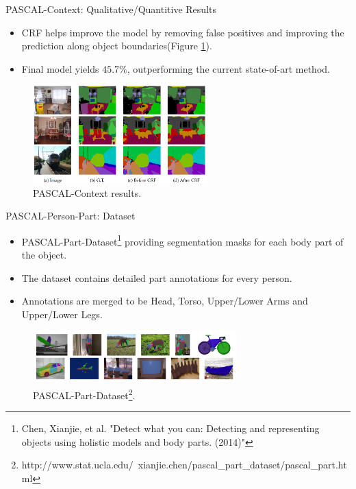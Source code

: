 \documentclass{beamer}
\begin{document}
\begin{frame}{PASCAL-Context: Qualitative/Quantitive Results}	
\begin{itemize}
	\item CRF helps improve the model by removing false positives and improving the prediction along object boundaries({\color{blue}Figure \ref{fig:M3}}).
	\item Final model yields {\color{blue}$45.7\%$}, outperforming the current state-of-art method.
\end{itemize}
\vspace{-0.4cm}
\begin{figure}
	\centering
	\includegraphics[width=0.60\textwidth]{figure/ss32.png}
	\captionsetup{justification=centering}
	\caption{PASCAL-Context results.}
	\label{fig:M3}
\end{figure}
\vspace{-0.4cm}
\end{frame}

\begin{frame}{PASCAL-Person-Part: Dataset}
\begin{itemize}
	\item {\color{blue}PASCAL-Part-Dataset}\footnote{Chen, Xianjie, et al. "Detect what you can: Detecting and representing\\ objects using holistic models and body parts. (2014)"} providing segmentation masks for each body part of the object.
	\item The dataset contains detailed part annotations for every person.
	\item Annotations are merged to be Head, Torso, Upper/Lower Arms and Upper/Lower Legs.
\end{itemize}	

\begin{figure}
	\centering
	\includegraphics[width=0.7\textwidth]{figure/ss33.png}
	\captionsetup{justification=centering}
	\caption{PASCAL-Part-Dataset\footnote{http://www.stat.ucla.edu/~xianjie.chen/pascal\_part\_dataset/pascal\_part.html}.}
\end{figure}
\end{frame}
\end{document}
